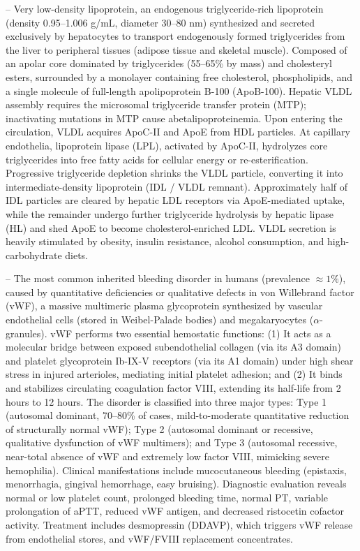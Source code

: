 -- Very low-density lipoprotein, an endogenous triglyceride-rich lipoprotein (density 0.95--1.006 g/mL, diameter 30--80 nm) synthesized and secreted exclusively by hepatocytes to transport endogenously formed triglycerides from the liver to peripheral tissues (adipose tissue and skeletal muscle). Composed of an apolar core dominated by triglycerides (55--65\% by mass) and cholesteryl esters, surrounded by a monolayer containing free cholesterol, phospholipids, and a single molecule of full-length apolipoprotein B-100 (ApoB-100). Hepatic VLDL assembly requires the microsomal triglyceride transfer protein (MTP); inactivating mutations in MTP cause abetalipoproteinemia. Upon entering the circulation, VLDL acquires ApoC-II and ApoE from HDL particles. At capillary endothelia, lipoprotein lipase (LPL), activated by ApoC-II, hydrolyzes core triglycerides into free fatty acids for cellular energy or re-esterification. Progressive triglyceride depletion shrinks the VLDL particle, converting it into intermediate-density lipoprotein (IDL / VLDL remnant). Approximately half of IDL particles are cleared by hepatic LDL receptors via ApoE-mediated uptake, while the remainder undergo further triglyceride hydrolysis by hepatic lipase (HL) and shed ApoE to become cholesterol-enriched LDL. VLDL secretion is heavily stimulated by obesity, insulin resistance, alcohol consumption, and high-carbohydrate diets.

-- The most common inherited bleeding disorder in humans (prevalence $\approx 1\%$), caused by quantitative deficiencies or qualitative defects in von Willebrand factor (vWF), a massive multimeric plasma glycoprotein synthesized by vascular endothelial cells (stored in Weibel-Palade bodies) and megakaryocytes ($\alpha$-granules). vWF performs two essential hemostatic functions: (1) It acts as a molecular bridge between exposed subendothelial collagen (via its A3 domain) and platelet glycoprotein Ib-IX-V receptors (via its A1 domain) under high shear stress in injured arterioles, mediating initial platelet adhesion; and (2) It binds and stabilizes circulating coagulation factor VIII, extending its half-life from 2 hours to 12 hours. The disorder is classified into three major types: Type 1 (autosomal dominant, 70--80\% of cases, mild-to-moderate quantitative reduction of structurally normal vWF); Type 2 (autosomal dominant or recessive, qualitative dysfunction of vWF multimers); and Type 3 (autosomal recessive, near-total absence of vWF and extremely low factor VIII, mimicking severe hemophilia). Clinical manifestations include mucocutaneous bleeding (epistaxis, menorrhagia, gingival hemorrhage, easy bruising). Diagnostic evaluation reveals normal or low platelet count, prolonged bleeding time, normal PT, variable prolongation of aPTT, reduced vWF antigen, and decreased ristocetin cofactor activity. Treatment includes desmopressin (DDAVP), which triggers vWF release from endothelial stores, and vWF/FVIII replacement concentrates.

